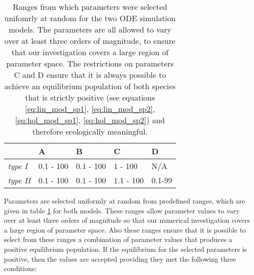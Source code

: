 \begin{center}
\begin{table}
\centering
    \begin{tabular}{| l | l | l | l | l |}

    \hline
     & A & B & C & D\\ \hline
    \emph{type I} & 0.1 - 100 & 0.1 - 100 & 1 - 100 & N/A \\ \hline
    \emph{type II} & 0.1 - 100 & 0.1 - 100 & 1.1 - 100 & 0.1-99 \\
    \hline
    \end{tabular}
\caption{Ranges from which parameters were selected unifomrly at random for the two ODE simulation models. The parameters are all allowed to vary over at least three orders of magnitude, to ensure that our investigation covers a large region of parameter space. The restrictions on parameters C and D ensure that it is always possible to achieve an equilibrium population of both species that is strictly positive (see equations \eqref{eq:lin_mod_sp1}, \eqref{eq:lin_mod_sp2}, \eqref{eq:hol_mod_sp1}, \eqref{eq:hol_mod_sp2}) and therefore ecologically meaningful.}
\label{table:p_range}    
\end{table}
\end{center}

Parameters are selected uniformly at random from predefined ranges, which are given in table \ref{table:p_range} for both models. These ranges allow parameter values to vary over at least three orders of magnitude so that our numerical investigation covers a large region of parameter space. Also these ranges ensure that it is possible to select from these ranges a combination of parameter values that produces a positive equilibrium population. If the equilibrium for the selected parameters is positive, then the values are accepted providing they met the following three conditions:
 
